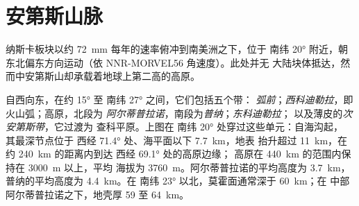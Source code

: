 \section{安第斯山脉}\label{sec:b2:himalaya-andes:andes}

纳斯卡板块以约 \qty{72}{mm} 每年的速率俯冲到南美洲之下，位于
南纬 \ang{20} 附近，朝东北偏东方向运动（依 NNR-MORVEL56 角速度）。此处并无
大陆块体抵达，然而中安第斯山却承载着地球上第二高的高原。

自西向东，在约 \ang{15} 至 南纬 \ang{27} 之间，它们包括五个带：
\emph{弧前}；\emph{西科迪勒拉}，即火山弧；高原，北段为
\emph{阿尔蒂普拉诺}，南段为\emph{普纳}；\emph{东科迪勒拉}；
以及薄皮的\emph{次安第斯带}，它过渡为
查科平原。上图在 南纬 \ang{20} 处穿过这些单元：自海沟起，
其最深节点位于 西经 \ang{71.4} 处、海平面以下 \qty{7.7}{km}，地表
抬升超过 \qty{11}{km}，在约 \qty{240}{km} 的距离内到达 西经 \ang{69.1} 处的高原边缘；
高原在 \qty{440}{km} 的范围内保持在 \qty{3000}{m} 以上，平均
海拔为 \qty{3760}{m}。阿尔蒂普拉诺的平均高度为 \qty{3.7}{km}，普纳的平均高度为
\qty{4.4}{km}。在 南纬 \ang{23} 以北，莫霍面通常深于 \qty{60}{km}；在
中部阿尔蒂普拉诺之下，地壳厚 59 至 \qty{64}{km}。

